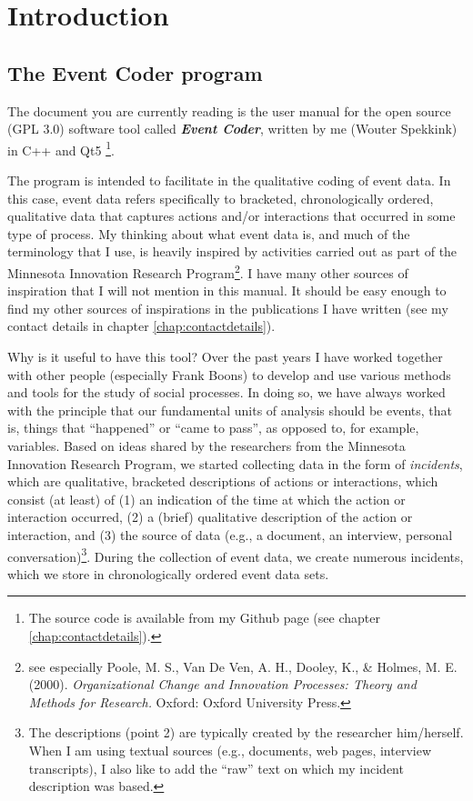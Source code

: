 \documentclass{memoir}
\begin{document}
\chapter{Introduction}
\label{chap:introduction}

\section{The Event Coder program}
\label{sec:eventcoderprogram}

The document you are currently reading is the user manual for the open source (GPL 3.0) software tool called \emph{\textbf{Event Coder}}, written by me (Wouter Spekkink) in C++ and Qt5 \footnote{The source code is available from my Github page (see chapter \ref{chap:contactdetails}).}.

The program is intended to facilitate in the qualitative coding of event data. In this case, event data refers specifically to bracketed, chronologically ordered, qualitative data that captures actions and/or interactions that occurred in some type of process. My thinking about what event data is, and much of the terminology that I use, is heavily inspired by activities carried out as part of the Minnesota Innovation Research Program\footnote{see especially Poole, M. S., Van De Ven, A. H., Dooley, K., \& Holmes, M. E. (2000). \emph{Organizational Change and Innovation Processes: Theory and Methods for Research.} Oxford: Oxford University Press.}. I have many other sources of inspiration that I will not mention in this manual. It should be easy enough to find my other sources of inspirations in the publications I have written (see my contact details in chapter \ref{chap:contactdetails}).

Why is it useful to have this tool? Over the past years I have worked together with other people (especially Frank Boons) to develop and use various methods and tools for the study of social processes. In doing so, we have always worked with the principle that our fundamental units of analysis should be events, that is, things that ``happened'' or ``came to pass'', as opposed to, for example, variables. Based on ideas shared by the researchers from the Minnesota Innovation Research Program, we started collecting data in the form of \emph{incidents}, which are qualitative, bracketed descriptions of actions or interactions, which consist (at least) of (1) an indication of the time at which the action or interaction occurred, (2) a (brief) qualitative description of the action or interaction, and (3) the source of data (e.g., a document, an interview, personal conversation)\footnote{The descriptions (point 2) are typically created by the researcher him/herself. When I am using textual sources (e.g., documents, web pages, interview transcripts), I also like to add the ``raw'' text on which my incident description was based.}. During the collection of event data, we create numerous incidents, which we store in chronologically ordered event data sets.
\end{document}
